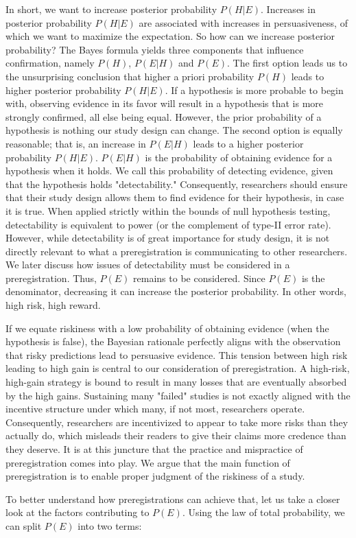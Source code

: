 \documentclass[jou,a4paper]{apa7}
\begin{document}
In short, we want to increase posterior probability $P(H|E)$.
Increases in posterior probability $P(H|E)$ are associated with increases in persuasiveness, of which we want to maximize the expectation.
So how can we increase posterior probability?
The Bayes formula yields three components that influence confirmation, namely $P(H)$, $P(E|H)$ and $P(E)$.
The first option leads us to the unsurprising conclusion that higher a priori probability $P(H)$ leads to higher posterior probability $P(H|E)$.
If a hypothesis is more probable to begin with, observing evidence in its favor will result in a hypothesis that is more strongly confirmed, all else being equal.
However, the prior probability of a hypothesis is nothing our study design can change.
The second option is equally reasonable; that is, an increase in $P(E|H)$ leads to a higher posterior probability $P(H|E)$.
$P(E|H)$ is the probability of obtaining evidence for a hypothesis when it holds.
We call this probability of detecting evidence, given that the hypothesis holds "detectability."
Consequently, researchers should ensure that their study design allows them to find evidence for their hypothesis, in case it is true.
When applied strictly within the bounds of null hypothesis testing, detectability is equivalent to power (or the complement of type-II error rate).
However, while detectability is of great importance for study design, it is not directly relevant to what a preregistration is communicating to other researchers.
We later discuss how issues of detectability must be considered in a preregistration.
Thus, $P(E)$ remains to be considered.
Since $P(E)$ is the denominator, decreasing it can increase the posterior probability.
In other words, high risk, high reward.\par
If we equate riskiness with a low probability of obtaining evidence (when the hypothesis is false), the Bayesian rationale perfectly aligns with the observation that risky predictions lead to persuasive evidence.
This tension between high risk leading to high gain is central to our consideration of preregistration.
A high-risk, high-gain strategy is bound to result in many losses that are eventually absorbed by the high gains.
Sustaining many "failed" studies is not exactly aligned with the incentive structure under which many, if not most, researchers operate.
Consequently, researchers are incentivized to appear to take more risks than they actually do, which misleads their readers to give their claims more credence than they deserve.
It is at this juncture that the practice and mispractice of preregistration comes into play.
We argue that the main function of preregistration is to enable proper judgment of the riskiness of a study.\par
To better understand how preregistrations can achieve that, let us take a closer look at the factors contributing to $P(E)$. 
Using the law of total probability, we can split $P(E)$ into two terms:
\end{document}
